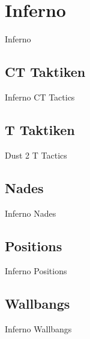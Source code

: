 \newpage




\chapter{Inferno}
\label{chap:inferno}
Inferno

\section{CT Taktiken}
\label{sect:inferno_ct}
Inferno CT Tactics

\section{T Taktiken}
\label{sect:inferno_t}
Dust 2 T Tactics

\section{Nades}
\label{sect:inferno_nades}
Inferno Nades

\section{Positions}
\label{sect:inferno_positions}
Inferno Positions

\section{Wallbangs}
\label{sect:inferno_wallbangs}
Inferno Wallbangs